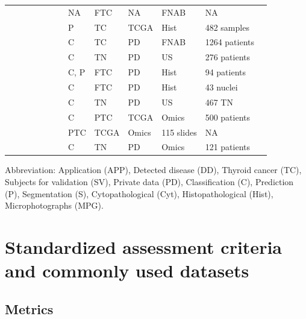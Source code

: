 \documentclass[a4paper,fleqn]{cas-sc}
\newcommand{\cmark}{\ding{51}}%
\begin{document}
\begin{table}[t!]
\begin{tabular}{
m{0.5cm}
m{0.3cm}
m{0.3cm}
m{0.3cm}
m{0.3cm}
m{0.3cm}
m{0.3cm}
m{1.3cm}
m{1.3cm}
m{1.3cm}
m{1.3cm}
m{2.3cm}
m{2.3cm}
}
\cite{li2021artificial} &\cmark & \cmark&  & & & \cmark & NA & FTC & NA & FNAB & NA \\ 

\cite{zhao2019assessment} &\cmark & \cmark & & & & \cmark & P & TC & TCGA & Hist& 482 samples \\ 

\cite{wildman2019using} & \cmark & \cmark & & & & \cmark & C & TC & PD & FNAB & 1264 patients \\

\cite{wang2019automatic} &\cmark & \cmark  & & & & \cmark & C & TN & PD & US & 276 patients \\ 

\cite{ozolek2014accurate} &  \cmark & & & & & \cmark & C, P & FTC & PD & Hist & 94 patients \\ 

\cite{wang2010detection} & \cmark & & & \cmark & & & C & FTC & PD & Hist & 43 nuclei \\ 

\cite{zhu2019deep} &  \cmark & & & \cmark & & & C & TN & PD & US & 467 TN  \\  

\cite{bhalla2020expression} &  \cmark & & & \cmark & & & C & PTC & TCGA & Omics & 500 patients  \\

\cite{dolezal2020deep} &  & \cmark & & & & \cmark & PTC & TCGA & Omics & 115 slides & NA \\ 

\cite{daniels2020machine} &  \cmark & & & & & \cmark & C & TN & PD & Omics & 121 patients \\ 

\hline
\end{tabular}
\begin{flushleft}
Abbreviation: Application (APP), Detected disease (DD), Thyroid cancer (TC), Subjects for validation (SV), Private data (PD), Classification (C), Prediction (P), Segmentation (S), Cytopathological (Cyt), Histopathological (Hist),
Microphotographs (MPG).
\end{flushleft}
\end{table}


\section{Standardized assessment criteria and commonly used datasets}  \label{sec5}
\subsection{Metrics}
\end{document}
